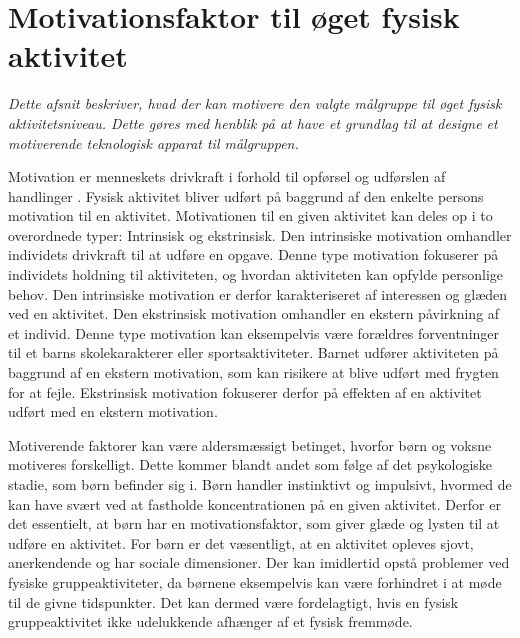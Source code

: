 \section{Motivationsfaktor til øget fysisk aktivitet}\label{motivation_boern}
\textit{Dette afsnit beskriver, hvad der kan motivere den valgte målgruppe til øget fysisk aktivitetsniveau. Dette gøres med henblik på at have et grundlag til at designe et motiverende teknologisk apparat til målgruppen.}

Motivation er menneskets drivkraft i forhold til opførsel og udførslen af handlinger \citep{V.Brown2007}. Fysisk aktivitet bliver udført på baggrund af den enkelte persons motivation til en aktivitet. Motivationen til en given aktivitet kan deles op i to overordnede typer: Intrinsisk og ekstrinsisk. Den intrinsiske motivation omhandler individets drivkraft til at udføre en opgave. Denne type motivation fokuserer på individets holdning til aktiviteten, og hvordan aktiviteten kan opfylde personlige behov. Den intrinsiske motivation er derfor karakteriseret af interessen og glæden ved en aktivitet. Den ekstrinsisk motivation omhandler en ekstern påvirkning af et individ. Denne type motivation kan eksempelvis være forældres forventninger til et barns skolekarakterer eller sportsaktiviteter. Barnet udfører aktiviteten på baggrund af en ekstern motivation, som kan risikere at blive udført med frygten for at fejle. Ekstrinsisk motivation fokuserer derfor på effekten af en aktivitet udført med en ekstern motivation. \citep{J.Sebire2013} 

Motiverende faktorer kan være aldersmæssigt betinget, hvorfor børn og voksne motiveres forskelligt. Dette kommer blandt andet som følge af det psykologiske stadie, som børn befinder sig i. Børn handler instinktivt og impulsivt, hvormed de kan have svært ved at fastholde koncentrationen på en given aktivitet. Derfor er det essentielt, at børn har en motivationsfaktor, som giver glæde og lysten til at udføre en aktivitet. \citep{V.Brown2007} For børn er det væsentligt, at en aktivitet opleves sjovt, anerkendende og har sociale dimensioner. Der kan imidlertid opstå problemer ved fysiske gruppeaktiviteter, da børnene eksempelvis kan være forhindret i at møde til de givne tidspunkter. Det kan dermed være fordelagtigt, hvis en fysisk gruppeaktivitet ikke udelukkende afhænger af et fysisk fremmøde.~\citep{Wied2011,Romani2013}

